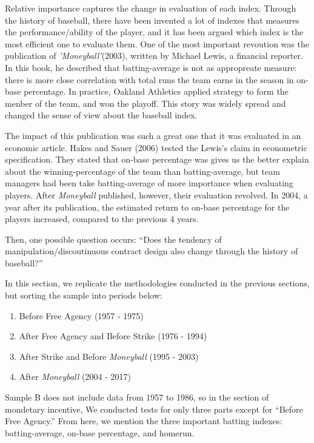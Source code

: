 \documentclass[dvipdfmx, 12pt]{article}
\begin{document}
Relative importance captures the change in evaluation of each index. Through the history of baseball, there have been invented a lot of indexes that measures the performance/ability of the player, and it has been argued which index is the most efficient one to evaluate them. One of the most important revoution was the publication of \textit{'Moneyball'}(2003), written by Michael Lewis, a financial reporter. In this book, he described that batting-average is not as appropreate measure: there is more close correlation with total runs the team earns in the season in on-base percentage. In practice, Oakland Athletics applied strategy to form the menber of the team, and won the playoff. This story was widely spread and changed the sense of view about the baseball index.

The impact of this publication was such a great one that it was evaluated in an economic article. Hakes and Sauer (2006) tested the Lewis's claim in econometric specification. They stated that on-base percentage was gives us the better explain about the winning-percentage of the team than batting-average, but team managers had been take batting-average of more importance when evaluating players. After \textit{Moneyball} published, however, their evaluation revolved. In 2004, a year after its publication, the estimated return to on-base percentage for the players increased, compared to the previous 4 years.

Then, one possible question occurs: ``Does the tendency of manipulation/discoutinuous contract design also change through the history of baseball?''

In this section, we replicate the methodologies conducted in the previous sections, but sorting the sample into periods below:

\begin{enumerate}
  \item Before Free Agency (1957 - 1975)

  \item After Free Agency and Before Strike (1976 - 1994)

  \item After Strike and Before \textit{Moneyball} (1995 - 2003)

  \item After \textit{Moneyball} (2004 - 2017)
\end{enumerate}

Sample B does not include data from 1957 to 1986, so in the section of mondetary incentive, We conducted tests for only three parts except for ``Before Free Agency.'' From here, we mention the three important batting indexes: batting-average, on-base percentage, and homerun.
\end{document}
